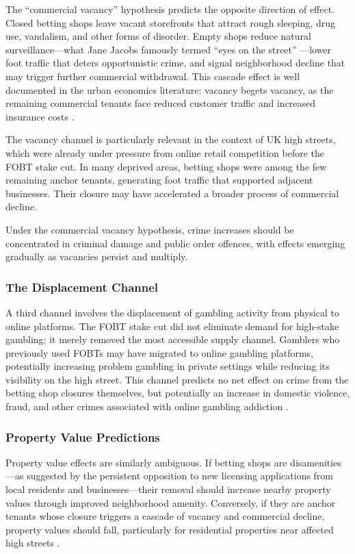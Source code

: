 \documentclass[12pt]{article}
\begin{document}
The ``commercial vacancy'' hypothesis predicts the opposite direction of effect. Closed betting shops leave vacant storefronts that attract rough sleeping, drug use, vandalism, and other forms of disorder. Empty shops reduce natural surveillance---what Jane Jacobs famously termed ``eyes on the street'' \citep{jacobs1961}---lower foot traffic that deters opportunistic crime, and signal neighborhood decline that may trigger further commercial withdrawal. This cascade effect is well documented in the urban economics literature: vacancy begets vacancy, as the remaining commercial tenants face reduced customer traffic and increased insurance costs \citep{mallach2018, glaeser1999}.

The vacancy channel is particularly relevant in the context of UK high streets, which were already under pressure from online retail competition before the FOBT stake cut. In many deprived areas, betting shops were among the few remaining anchor tenants, generating foot traffic that supported adjacent businesses. Their closure may have accelerated a broader process of commercial decline.

Under the commercial vacancy hypothesis, crime increases should be concentrated in criminal damage and public order offences, with effects emerging gradually as vacancies persist and multiply.

\subsubsection{The Displacement Channel}

A third channel involves the displacement of gambling activity from physical to online platforms. The FOBT stake cut did not eliminate demand for high-stake gambling; it merely removed the most accessible supply channel. Gamblers who previously used FOBTs may have migrated to online gambling platforms, potentially increasing problem gambling in private settings while reducing its visibility on the high street. This channel predicts no net effect on crime from the betting shop closures themselves, but potentially an increase in domestic violence, fraud, and other crimes associated with online gambling addiction \citep{wardle2014}.

\subsubsection{Property Value Predictions}

Property value effects are similarly ambiguous. If betting shops are disamenities---as suggested by the persistent opposition to new licensing applications from local residents and businesses---their removal should increase nearby property values through improved neighborhood amenity. Conversely, if they are anchor tenants whose closure triggers a cascade of vacancy and commercial decline, property values should fall, particularly for residential properties near affected high streets \citep{autor2014, papke1995}.
\end{document}

